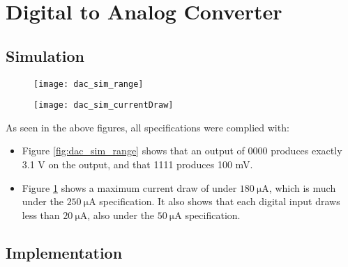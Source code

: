 \graphicspath{{content/3_results/figures}}
\section{Digital to Analog Converter}

\subsection{Simulation}

\begin{figure}[!htb]
    \centering
    \begin{minipage}{.5\textwidth}
        \centering
        \texttt{[image: dac\_sim\_range]}
        \label{fig:dac_sim_range}
    \end{minipage}
    \begin{minipage}{.45\textwidth}
        \centering
        \texttt{[image: dac\_sim\_currentDraw]}
        \label{fig:dac_sim_currentDraw}
    \end{minipage}
\end{figure}

As seen in the above figures, all specifications were complied with:
\begin{itemize}
    \item Figure \ref{fig:dac_sim_range} shows that an output of 0000 produces exactly 3.1 V on the output, and that 1111 produces 100 mV.
    \item Figure \ref{fig:dac_sim_currentDraw} shows a maximum current draw of under $\SI{180}{\micro\ampere}$, which is much under the $\SI{250}{\micro\ampere}$ specification.
          It also shows that each digital input draws less than $\SI{20}{\micro\ampere}$, also under the $\SI{50}{\micro\ampere}$ specification.
\end{itemize}

\subsection{Implementation}

